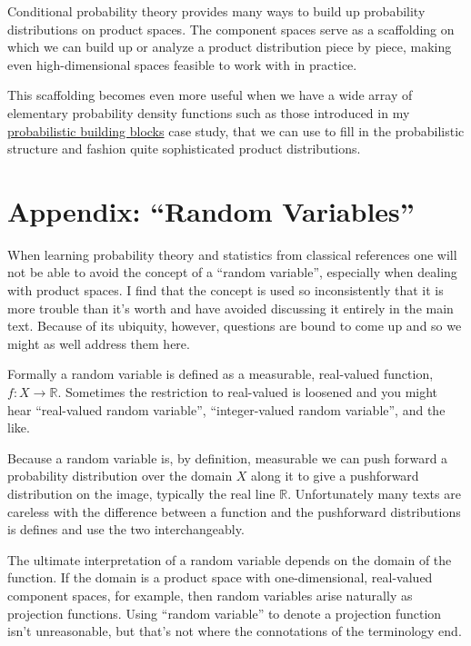 \documentclass[]{article}
\begin{document}
Conditional probability theory provides many ways to build up
probability distributions on product spaces. The component spaces serve
as a scaffolding on which we can build up or analyze a product
distribution piece by piece, making even high-dimensional spaces
feasible to work with in practice.

This scaffolding becomes even more useful when we have a wide array of
elementary probability density functions such as those introduced in my
\href{https://betanalpha.github.io/assets/case_studies/probability_densities.html}{probabilistic
building blocks} case study, that we can use to fill in the
probabilistic structure and fashion quite sophisticated product
distributions.

\hypertarget{appendix-random-variables}{%
\section{Appendix: ``Random
Variables''}\label{appendix-random-variables}}

When learning probability theory and statistics from classical
references one will not be able to avoid the concept of a ``random
variable'', especially when dealing with product spaces. I find that the
concept is used so inconsistently that it is more trouble than it's
worth and have avoided discussing it entirely in the main text. Because
of its ubiquity, however, questions are bound to come up and so we might
as well address them here.

Formally a random variable is defined as a measurable, real-valued
function, \(f : X \rightarrow \mathbb{R}\). Sometimes the restriction to
real-valued is loosened and you might hear ``real-valued random
variable'', ``integer-valued random variable'', and the like.

Because a random variable is, by definition, measurable we can push
forward a probability distribution over the domain \(X\) along it to
give a pushforward distribution on the image, typically the real line
\(\mathbb{R}\). Unfortunately many texts are careless with the
difference between a function and the pushforward distributions is
defines and use the two interchangeably.

The ultimate interpretation of a random variable depends on the domain
of the function. If the domain is a product space with one-dimensional,
real-valued component spaces, for example, then random variables arise
naturally as projection functions. Using ``random variable'' to denote a
projection function isn't unreasonable, but that's not where the
connotations of the terminology end.
\end{document}

